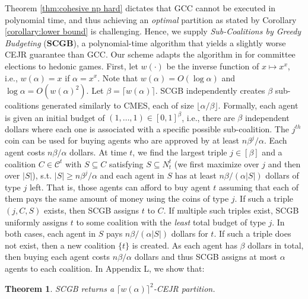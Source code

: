\documentclass[letterpaper]{article}
\newtheorem{theorem}{Theorem}
\begin{document}
Theorem \ref{thm:cohesive np hard} dictates that GCC cannot be executed in polynomial time, and thus achieving an \textit{optimal} partition as stated by Corollary \ref{corollary:lower bound} is challenging. Hence, we supply \textit{Sub-Coalitions by Greedy Budgeting} (\textbf{SCGB}), a polynomial-time algorithm that yields a slightly worse CEJR guarantee than GCC. Our scheme adapts the algorithm in \cite[Section 5.3]{do2022online} for committee elections to hedonic games. First, let $w(\cdot)$ be the inverse function of $x \mapsto x^x$, i.e., $w(\alpha) = x$ if $\alpha = x^x$. Note that $w(\alpha) = O(\log \alpha)$ and $\log \alpha = O(w(\alpha)^2)$. Let $\beta = \lceil w(\alpha) \rceil$. SCGB independently creates $\beta$ sub-coalitions generated similarly to CMES, each of size $\lfloor \alpha/\beta \rfloor$. Formally, each agent is given an initial budget of $(1, \dots, 1) \in [0,1]^\beta$, i.e., there are $\beta$ independent dollars where each one is associated with a specific possible sub-coalition. The $j^{th}$ coin can be used for buying agents who are approved by at least $n \beta^j /\alpha$. Each agent costs $n \beta/\alpha$ dollars. At time $t$, we find the largest triple $j \in [\beta]$ and a coalition $C \in \mathcal{C}^t$ with $S \subseteq C$ satisfying $S \subseteq N_t^t$ (we first maximize over $j$ and then over $|S|$), s.t. $|S| \geq n \beta^j /\alpha$ and each agent in $S$ has at least $n\beta /(\alpha |S|)$ dollars of type $j$ left. That is, those agents can afford to buy agent $t$ assuming that each of them pays the same amount of money using the coins of type $j$. If such a triple $(j,C,S)$ exists, then SCGB assigns $t$ to $C$. If multiple such triples exist, SCGB uniformly assigns $t$ to some coalition with the \textit{least} total budget of type $j$. In both cases, each agent in $S$ pays $n\beta /(\alpha |S|)$ dollars for $t$. If such a triple does not exist, then a new coalition $\{t\}$ is created. As each agent has $\beta$ dollars in total, then buying each agent costs $n \beta/\alpha$ dollars and thus SCGB assigns at most $\alpha$ agents to each coalition. In Appendix L, we show that: %
\begin{theorem}
\label{thm:scgb}
SCGB returns a $\lceil w(\alpha) \rceil^2$-CEJR partition.
\end{theorem}
\end{document}
